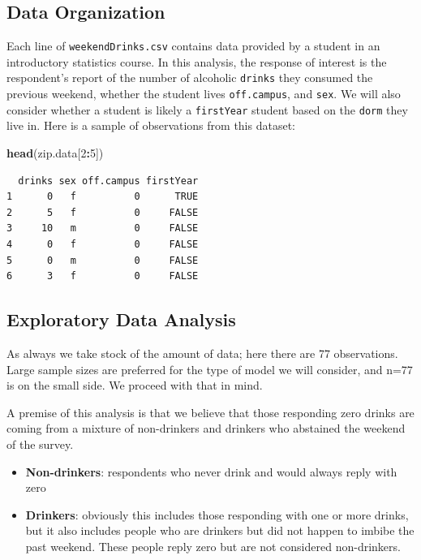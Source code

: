 \documentclass[
]{krantz}
\newenvironment{Shaded}{\begin{snugshade}}{\end{snugshade}}
\newcommand{\DecValTok}[1]{\textcolor[rgb]{0.06,0.06,0.06}{#1}}
\newcommand{\KeywordTok}[1]{\textcolor[rgb]{0.27,0.27,0.27}{\textbf{#1}}}
\newcommand{\NormalTok}[1]{#1}
\newcommand{\OperatorTok}[1]{\textcolor[rgb]{0.43,0.43,0.43}{\textbf{#1}}}
\providecommand{\tightlist}{%
  \setlength{\itemsep}{0pt}\setlength{\parskip}{0pt}}
\begin{document}
\hypertarget{data-organization-2}{%
\subsection{Data Organization}\label{data-organization-2}}

Each line of \texttt{weekendDrinks.csv} contains data provided by a student in an introductory statistics course. In this analysis, the response of interest is the respondent's report of the number of alcoholic \texttt{drinks} they consumed the previous weekend, whether the student lives \texttt{off.campus}, and \texttt{sex}. We will also consider whether a student is likely a \texttt{firstYear} student based on the \texttt{dorm} they live in. Here is a sample of observations from this dataset:

\begin{Shaded}
\begin{Highlighting}[]
\KeywordTok{head}\NormalTok{(zip.data[}\DecValTok{2}\OperatorTok{:}\DecValTok{5}\NormalTok{])}
\end{Highlighting}
\end{Shaded}

\begin{verbatim}
  drinks sex off.campus firstYear
1      0   f          0      TRUE
2      5   f          0     FALSE
3     10   m          0     FALSE
4      0   f          0     FALSE
5      0   m          0     FALSE
6      3   f          0     FALSE
\end{verbatim}

\hypertarget{exploratory-data-analysis-1}{%
\subsection{Exploratory Data Analysis}\label{exploratory-data-analysis-1}}

As always we take stock of the amount of data; here there are 77 observations. Large sample sizes are preferred for the type of model we will consider, and n=77 is on the small side. We proceed with that in mind.

A premise of this analysis is that we believe that those responding zero drinks are coming from a mixture of non-drinkers and drinkers who abstained the weekend of the survey.

\begin{itemize}
\tightlist
\item
  \textbf{Non-drinkers}: respondents who never drink and would always reply with zero
\item
  \textbf{Drinkers}: obviously this includes those responding with one or more drinks, but it also includes people who are drinkers but did not happen to imbibe the past weekend. These people reply zero but are not considered non-drinkers.
\end{itemize}
\end{document}
